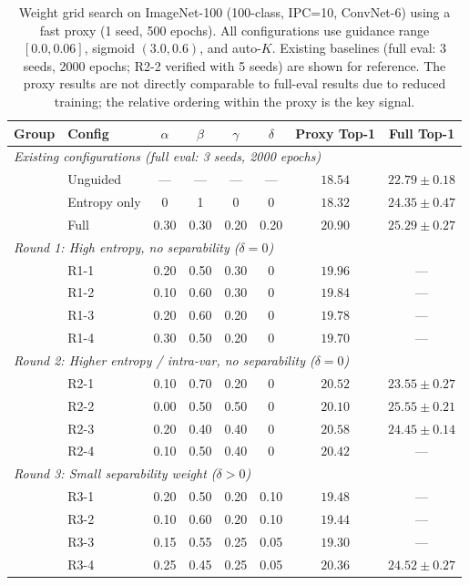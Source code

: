 \begin{table}[t]
\centering
\caption{Weight grid search on ImageNet-100 (100-class, IPC=10, ConvNet-6) using a fast proxy (1 seed, 500 epochs). All configurations use guidance range $[0.0, 0.06]$, sigmoid $(3.0, 0.6)$, and auto-$K$. Existing baselines (full eval: 3 seeds, 2000 epochs; R2-2 verified with 5 seeds) are shown for reference. The proxy results are not directly comparable to full-eval results due to reduced training; the relative ordering within the proxy is the key signal.}
\label{tab:weight-grid}
\begin{tabular}{llcccccc}
\toprule
\textbf{Group} & \textbf{Config} & $\alpha$ & $\beta$ & $\gamma$ & $\delta$ & \textbf{Proxy Top-1} & \textbf{Full Top-1} \\
\midrule
\multicolumn{8}{l}{\textit{Existing configurations (full eval: 3 seeds, 2000 epochs)}} \\
& Unguided & --- & --- & --- & --- & $18.54$ & $22.79 \pm 0.18$ \\
& Entropy only & 0 & 1 & 0 & 0 & $18.32$ & $24.35 \pm 0.47$ \\
& Full \cags{} & 0.30 & 0.30 & 0.20 & 0.20 & $20.90$ & $25.29 \pm 0.27$ \\
\midrule
\multicolumn{8}{l}{\textit{Round 1: High entropy, no separability ($\delta = 0$)}} \\
& R1-1 & 0.20 & 0.50 & 0.30 & 0 & $19.96$ & --- \\
& R1-2 & 0.10 & 0.60 & 0.30 & 0 & $19.84$ & --- \\
& R1-3 & 0.20 & 0.60 & 0.20 & 0 & $19.78$ & --- \\
& R1-4 & 0.30 & 0.50 & 0.20 & 0 & $19.70$ & --- \\
\midrule
\multicolumn{8}{l}{\textit{Round 2: Higher entropy / intra-var, no separability ($\delta = 0$)}} \\
& R2-1 & 0.10 & 0.70 & 0.20 & 0 & $20.52$ & $23.55 \pm 0.27$ \\
& R2-2 & 0.00 & 0.50 & 0.50 & 0 & $20.10$ & $\mathbf{25.55 \pm 0.21}$ \\
& R2-3 & 0.20 & 0.40 & 0.40 & 0 & $\mathbf{20.58}$ & $24.45 \pm 0.14$ \\
& R2-4 & 0.10 & 0.50 & 0.40 & 0 & $20.42$ & --- \\
\midrule
\multicolumn{8}{l}{\textit{Round 3: Small separability weight ($\delta > 0$)}} \\
& R3-1 & 0.20 & 0.50 & 0.20 & 0.10 & $19.48$ & --- \\
& R3-2 & 0.10 & 0.60 & 0.20 & 0.10 & $19.44$ & --- \\
& R3-3 & 0.15 & 0.55 & 0.25 & 0.05 & $19.30$ & --- \\
& R3-4 & 0.25 & 0.45 & 0.25 & 0.05 & $20.36$ & $24.52 \pm 0.27$ \\
\bottomrule
\end{tabular}
\end{table}

